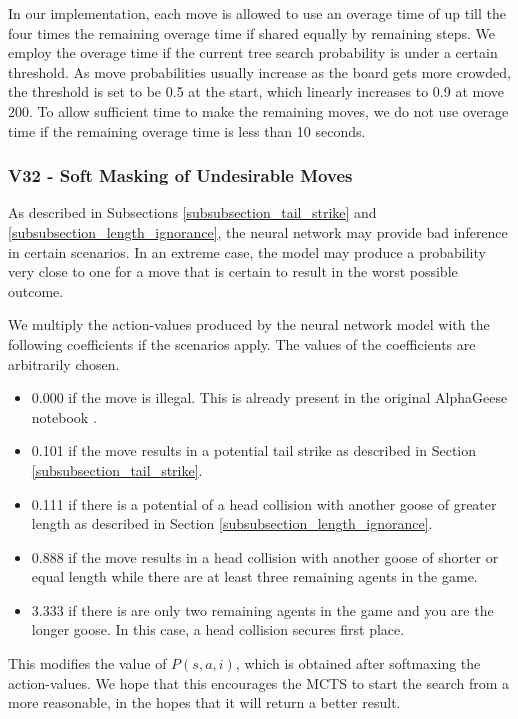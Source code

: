 In our implementation, each move is allowed to use an overage time of up till the four times the remaining overage time if shared equally by remaining steps. We employ the overage time if the current tree search probability is under a certain threshold. As move probabilities usually increase as the board gets more crowded, the threshold is set to be 0.5 at the start, which linearly increases to 0.9 at move 200. To allow sufficient time to make the remaining moves, we do not use overage time if the remaining overage time is less than 10 seconds.

\subsubsection{V32 - Soft Masking of Undesirable Moves}
\label{subsubsection_v32}

As described in Subsections \ref{subsubsection_tail_strike} and \ref{subsubsection_length_ignorance}, the neural network may provide bad inference in certain scenarios. In an extreme case, the model may produce a probability very close to one for a move that is certain to result in the worst possible outcome.

We multiply the action-values produced by the neural network model with the following coefficients if the scenarios apply. The values of the coefficients are arbitrarily chosen.
\begin{itemize}
\item 0.000 if the move is illegal. This is already present in the original AlphaGeese notebook \cite{notebook_alphageese_baseline}.
\item 0.101 if the move results in a potential tail strike as described in Section \ref{subsubsection_tail_strike}.
\item 0.111 if there is a potential of a head collision with another goose of greater length as described in Section \ref{subsubsection_length_ignorance}.
\item 0.888 if the move results in a head collision with another goose of shorter or equal length while there are at least three remaining agents in the game.
\item 3.333 if there is are only two remaining agents in the game and you are the longer goose. In this case, a head collision secures first place.
\end{itemize}

This modifies the value of $P(s,a,i)$, which is obtained after softmaxing the action-values. We hope that this encourages the MCTS to start the search from a more reasonable, in the hopes that it will return a better result.
